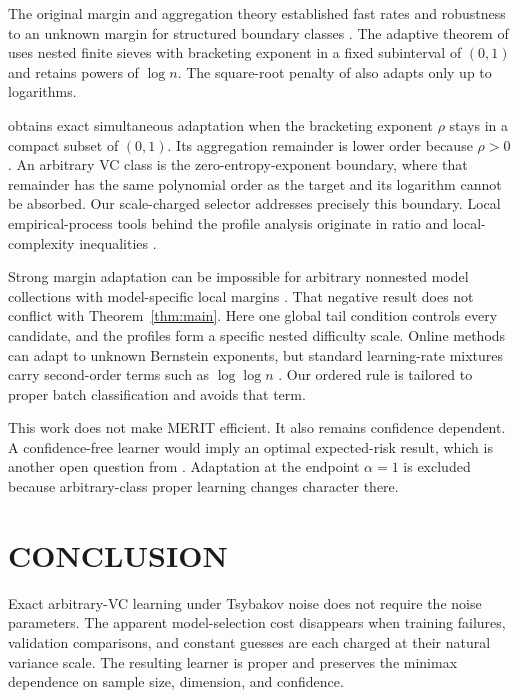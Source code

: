 \documentclass[twoside]{article}
\begin{document}
The original margin and aggregation theory established fast rates and robustness to an unknown margin for structured boundary classes \citep{mammen1999smooth,tsybakov2004optimal}. The adaptive theorem of \citet{tsybakov2004optimal} uses nested finite sieves with bracketing exponent in a fixed subinterval of $(0,1)$ and retains powers of $\log n$. The square-root penalty of \citet{tsybakov2005square} also adapts only up to logarithms.

\citet{lecue2007simultaneous} obtains exact simultaneous adaptation when the bracketing exponent $\rho$ stays in a compact subset of $(0,1)$. Its aggregation remainder is lower order because $\rho>0$. An arbitrary VC class is the zero-entropy-exponent boundary, where that remainder has the same polynomial order as the target and its logarithm cannot be absorbed. Our scale-charged selector addresses precisely this boundary. Local empirical-process tools behind the profile analysis originate in ratio and local-complexity inequalities \citep{gine2006concentration,koltchinskii2006local,bartlett2006empirical}.

Strong margin adaptation can be impossible for arbitrary nonnested model collections with model-specific local margins \citep{arlot2011margin}. That negative result does not conflict with Theorem~\ref{thm:main}. Here one global tail condition controls every candidate, and the profiles form a specific nested difficulty scale. Online methods can adapt to unknown Bernstein exponents, but standard learning-rate mixtures carry second-order terms such as $\log\log n$ \citep{koolen2016combining}. Our ordered rule is tailored to proper batch classification and avoids that term.

This work does not make MERIT efficient. It also remains confidence dependent. A confidence-free learner would imply an optimal expected-risk result, which is another open question from \citet{hanneke2026optimal}. Adaptation at the endpoint $\alpha=1$ is excluded because arbitrary-class proper learning changes character there.

\section{CONCLUSION}

Exact arbitrary-VC learning under Tsybakov noise does not require the noise parameters. The apparent model-selection cost disappears when training failures, validation comparisons, and constant guesses are each charged at their natural variance scale. The resulting learner is proper and preserves the minimax dependence on sample size, dimension, and confidence.



\appendix

\end{document}
